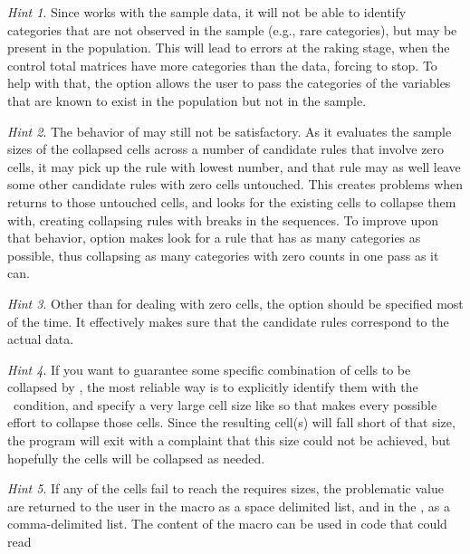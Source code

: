 \textit{Hint 1}. Since  works with the sample data,
it will not be able to identify categories that are not observed in the sample (e.g., rare categories),
but may be present in the population. This will lead to errors at the raking stage,
when the control total matrices have more categories than the data, forcing  to stop.
To help with that, the option  allows the user to pass the categories
of the variables that are known to exist in the population but not in the sample.

\textit{Hint 2}. The behavior of  may still not be
satisfactory. As it evaluates the sample sizes of the collapsed cells across a number
of candidate rules that involve zero cells, it may pick up the rule with lowest
number, and that rule may as well leave some other candidate rules with zero cells untouched.
This creates problems when  returns to those untouched cells,
and looks for the existing cells to collapse them with, creating collapsing rules with breaks
in the sequences. To improve upon that behavior, option  makes
 look for a rule that has as many categories as possible, thus collapsing
as many categories with zero counts in one pass as it can.

\textit{Hint 3}. Other than for dealing with zero cells, the option  should be specified
most of the time. It effectively makes sure that the candidate rules correspond to the actual data.

\textit{Hint 4}.
If you want to guarantee some specific combination of cells to be collapsed by ,
the most reliable way is to explicitly identify them with the \ifexp\ condition, and specify
a very large cell size like  so that  makes every possible
effort to collapse those cells. Since the resulting cell(s) will fall short of that size, the program will exit
with a complaint that this size could not be achieved,
but hopefully the cells will be collapsed as needed.

\textit{Hint 5}.
If any of the cells fail to reach the requires sizes, the problematic value are returned to the user
in the  macro as a space delimited list, and in the , as a comma-delimited list.
The content of the  macro can be used in code that could read

